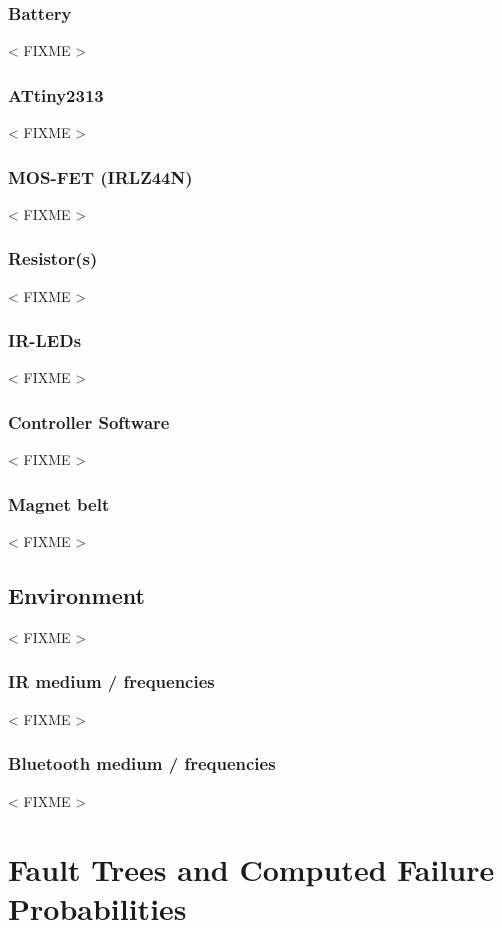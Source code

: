 \documentclass[a4paper,parskip,headheight=38pt]{scrartcl} %
\newcommand{\incomplete}[1]{\textless{} #1 \textgreater{}}
\begin{document}
\subsubsection{Battery}
\incomplete{FIXME}

\subsubsection{ATtiny2313}
\incomplete{FIXME}

\subsubsection{MOS-FET (IRLZ44N)}
\incomplete{FIXME}

\subsubsection{Resistor(s)}
\incomplete{FIXME}

\subsubsection{IR-LEDs}
\incomplete{FIXME}

\subsubsection{Controller Software}
\incomplete{FIXME}

\subsubsection{Magnet belt}
\incomplete{FIXME}

\subsection{Environment}
\incomplete{FIXME}

\subsubsection{IR medium / frequencies}
\incomplete{FIXME}

\subsubsection{Bluetooth medium / frequencies}

\incomplete{FIXME}


\section{Fault Trees and Computed Failure Probabilities}
\end{document}
